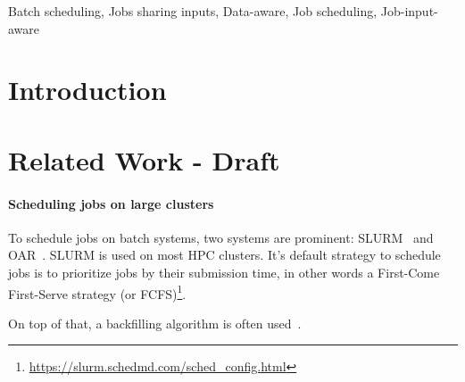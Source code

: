 \documentclass[conference,10pt]{IEEEtran}
\begin{document}

\begin{IEEEkeywords}
Batch scheduling,
Jobs sharing inputs,
Data-aware,
Job scheduling,
Job-input-aware
\end{IEEEkeywords}

\section{Introduction}\label{sec.introduction}

\section{Related Work - Draft}\label{sec.related_work}

\paragraph{Scheduling jobs on large clusters}

To schedule jobs on batch systems, two systems are prominent: SLURM~\cite{SLURM} and OAR~\cite{oar}.
SLURM is used on most HPC clusters. It's default strategy to schedule jobs is
to prioritize jobs by their submission time, in other words a First-Come First-Serve strategy
(or FCFS)\footnote{{\scriptsize\url{https://slurm.schedmd.com/sched_config.html}}}.

On top of that, a backfilling algorithm is often used~\cite{New_Backfill}.
\end{document}
